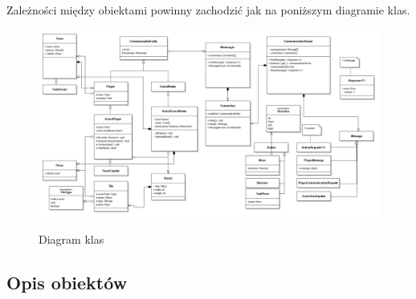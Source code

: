 \documentclass[11pt]{article}
\let\Oldsubsection\subsection
\renewcommand{\subsection}{\FloatBarrier\Oldsubsection}
\begin{document}
\par
Zależności między obiektami powinny zachodzić jak na poniższym diagramie klas.

\begin{figure}
\caption{Diagram klas}
\hspace*{-4cm}
\resizebox{1.4\textheight}{!}
{
\includegraphics{../res/class_diagram}
}
\end{figure}
\FloatBarrier

\subsection{Opis obiektów}
\end{document}
